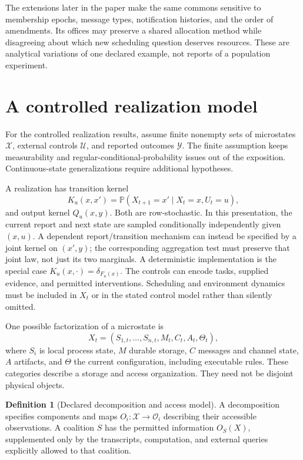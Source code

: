 \documentclass[11pt,letterpaper]{article}
\theoremstyle{plain}
\theoremstyle{definition}
\newtheorem{definition}[proposition]{Definition}
\theoremstyle{remark}
\newcommand{\X}{\mathcal X}
\newcommand{\U}{\mathcal U}
\newcommand{\Y}{\mathcal Y}
\newcommand{\Prob}{\mathbb P}
\begin{document}
The extensions later in the paper make the same commons sensitive to membership epochs, message types, notification histories, and the order of amendments. Its offices may preserve a shared allocation method while disagreeing about which new scheduling question deserves resources. These are analytical variations of one declared example, not reports of a population experiment.

\section{A controlled realization model}\label{sec:model}
For the controlled realization results, assume finite nonempty sets of microstates $\X$, external controls $\U$, and reported outcomes $\Y$. The finite assumption keeps measurability and regular-conditional-probability issues out of the exposition. Continuous-state generalizations require additional hypotheses.

A realization has transition kernel
\begin{equation}\label{eq:micro}
K_u(x,x')=\Prob(X_{t+1}=x'\mid X_t=x,U_t=u),
\end{equation}
and output kernel $Q_u(x,y)$. Both are row-stochastic. In this presentation, the current report and next state are sampled conditionally independently given $(x,u)$. A dependent report/transition mechanism can instead be specified by a joint kernel on $(x',y)$; the corresponding aggregation test must preserve that joint law, not just its two marginals. A deterministic implementation is the special case $K_u(x,\cdot)=\delta_{F_u(x)}$. The controls can encode tasks, supplied evidence, and permitted interventions. Scheduling and environment dynamics must be included in $X_t$ or in the stated control model rather than silently omitted.

One possible factorization of a microstate is
\[
X_t=(S_{1,t},\ldots,S_{n,t},M_t,C_t,A_t,\Theta_t),
\]
where $S_i$ is local process state, $M$ durable storage, $C$ messages and channel state, $A$ artifacts, and $\Theta$ the current configuration, including executable rules. These categories describe a storage and access organization. They need not be disjoint physical objects.

\begin{definition}[Declared decomposition and access model]\label{def:access}
A decomposition specifies components and maps $O_i:\X\to\mathcal O_i$ describing their accessible observations. A coalition $S$ has the permitted information $O_S(X)$, supplemented only by the transcripts, computation, and external queries explicitly allowed to that coalition.
\end{definition}
\end{document}
